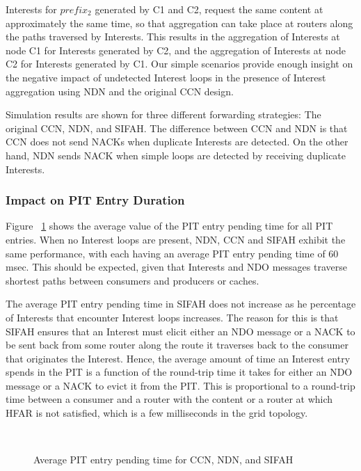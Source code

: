 \documentclass{ancs15-alternate}
\begin{document}
Interests for $prefix_2$ generated by C1 and C2, request the same content at approximately the same time, so that aggregation can take place at routers along the paths traversed by Interests. This results in the aggregation of Interests at node C1 for Interests generated by C2, and the aggregation of Interests  at node C2 for Interests generated by C1. Our simple scenarios provide enough insight on the negative impact of undetected Interest loops in the presence of Interest aggregation using NDN and the original CCN design. 

Simulation results are shown for three different forwarding strategies: The original CCN, NDN, and SIFAH. The
difference between CCN and NDN is that CCN  does not send NACKs when duplicate Interests are detected. On the other hand, NDN sends NACK when simple loops are detected by receiving duplicate Interests.



\subsubsection{Impact on PIT Entry Duration}

Figure ~\ref{pending-time} shows the average value of the PIT entry pending time for all PIT entries. When no Interest loops are present,  NDN, CCN and SIFAH 
exhibit the same performance, with each having an average PIT entry pending time of 60 msec.  This should be expected, given that Interests and NDO messages traverse shortest paths between consumers and producers or caches.

The average PIT entry pending time in SIFAH does not increase  as  he percentage of Interests that 
encounter  Interest loops  increases. 
The reason  for this  is that  SIFAH ensures that an  Interest must elicit either an NDO message or a NACK to be sent back from some router along the route it traverses back to the consumer that originates the Interest. Hence, the average amount of time an Interest entry spends in the PIT is a function of the round-trip time it takes for either an NDO message or a NACK to evict it from the PIT. This is proportional to a round-trip time between a consumer and a router with the content or a router  at which HFAR is not satisfied, which is a few milliseconds in the grid topology.

\vspace{-0.1in}
\begin{figure}[h]
\begin{centering}
    \mbox{
      }
\vspace{-0.2in}
   \caption{Average PIT entry pending time for CCN, NDN, and SIFAH}
   \label{pending-time}
\end{centering} 
\end{figure} 
\end{document}
